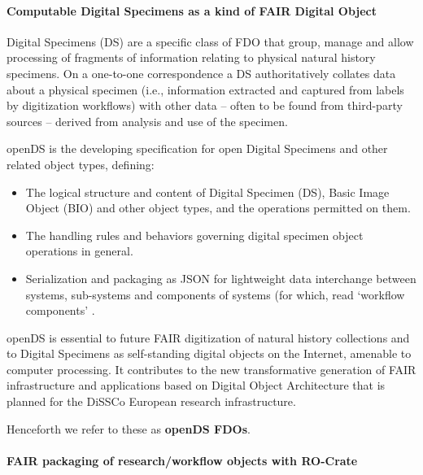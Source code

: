\paragraph{Computable Digital Specimens as a kind of FAIR Digital Object}\label{computable-digital-specimens-as-a-kind-of-fair-digital-object}

Digital Specimens (DS) are a specific class of FDO that group, manage
and allow processing of fragments of information relating to physical
natural history specimens. On a one-to-one correspondence a DS
authoritatively collates data about a physical specimen (i.e.,
information extracted and captured from labels by digitization
workflows) with other data -- often to be found from third-party sources
-- derived from analysis and use of the specimen.

\acrshort{openDS}
\cite{openDS 2021} is the developing specification for open Digital
Specimens and other related object types, defining: 

\begin{itemize}
  \item The logical
  structure and content of Digital Specimen (DS), Basic Image Object (BIO)
  and other object types, and the operations permitted on them.
  \item The
  handling rules and behaviors governing digital specimen object
  operations in general.
  \item Serialization and packaging as
  \acrfull{JSON}
  for lightweight data interchange
  between systems, sub-systems and components of systems (for which, read
  `workflow components' \cite{Bray 2017}. 
\end{itemize}

openDS is essential to future FAIR
digitization of natural history collections and to Digital Specimens as
self-standing digital objects on the Internet, amenable to computer
processing. It contributes to the new transformative generation of FAIR
infrastructure and applications based on Digital Object Architecture
that is planned for the 
\acrfull{DiSSCo}
\cite{Lannom 2020,Addink 2019,Hardisty 2020} European research infrastructure.

Henceforth we refer to these as \textbf{openDS FDOs}.

\paragraph{FAIR packaging of research/workflow objects with RO-Crate}\label{ch8:fair-packaging-of-researchworkflow-objects-with-ro-crate}

